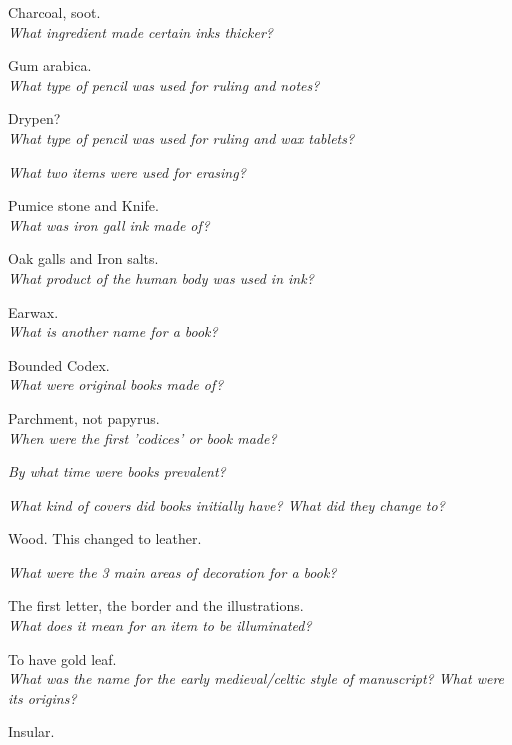 \documentclass[12pt]{article}
\begin{document}
Charcoal, soot.\\

\textit{What ingredient made certain inks thicker?}

Gum arabica.\\

\textit{What type of pencil was used for ruling and notes?}

Drypen?\\

\textit{What type of pencil was used for ruling and wax tablets?}



\textit{What two items were used for erasing?}

Pumice stone and Knife.\\

\textit{What was iron gall ink made of?}

Oak galls and Iron salts.\\

\textit{What product of the human body was used in ink?}

Earwax.\\

\textit{What is another name for a book?}

Bounded Codex.\\

\textit{What were original books made of?}

Parchment, not papyrus.\\

\textit{When were the first 'codices' or book made?}



\textit{By what time were books prevalent?}

\textit{What kind of covers did books initially have? What did they change to?}

Wood. This changed to leather.

\textit{What were the 3 main areas of decoration for a book?}

The first letter, the border and the illustrations.\\

\textit{What does it mean for an item to be illuminated?}

To have gold leaf.\\

\textit{What was the name for the early medieval/celtic style of manuscript? What were its origins?}

Insular.
\end{document}
